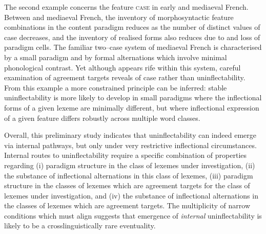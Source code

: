 \documentclass[output=paper,colorlinks,citecolor=brown]{langscibook}
\begin{document}
The second example concerns the feature \textsc{case} in early and mediaeval French. Between  and mediaeval French, the inventory of morphosyntactic feature combinations in the content paradigm reduces as the number of distinct values of case decreases, and the inventory of realised forms also reduces due to  and loss of paradigm cells. The familiar two--case system of mediaeval French is characterised by a small paradigm and by formal alternations which involve minimal phonological contrast. Yet although  appears rife within this system, careful examination of agreement targets reveals  of case rather than uninflectability. From this example a more constrained principle can be inferred: stable uninflectability is more likely to develop in small paradigms where the inflectional forms of a given lexeme are minimally different, but where inflectional expression of a given feature differs robustly across multiple word classes.

Overall, this preliminary study indicates that uninflectability can indeed emerge via internal pathways, but only under very restrictive inflectional circumstances. Internal routes to uninflectability require a specific combination of properties regarding (i) paradigm structure in the class of lexemes under investigation, (ii) the substance of inflectional alternations in this class of lexemes, (iii) paradigm structure in the classes of lexemes which are agreement targets for the class of lexemes under investigation, and (iv) the substance of inflectional alternations in the classes of lexemes which are agreement targets. The multiplicity of narrow conditions which must align suggests that emergence of \textit{internal} uninflectability is likely to be a crosslinguistically rare eventuality.
 
 
\end{document}
